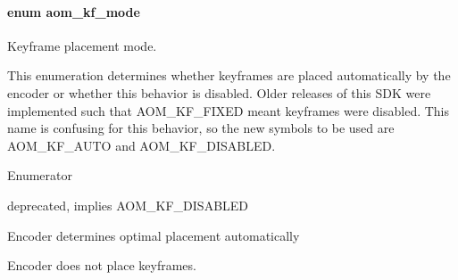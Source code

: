 \paragraph[{\texorpdfstring{aom\+\_\+kf\+\_\+mode}{aom_kf_mode}}]{\setlength{\rightskip}{0pt plus 5cm}enum {\bf aom\+\_\+kf\+\_\+mode}}\hypertarget{group__encoder_gac0498fc02cd368e6d9675cdb0bab5a84}{}\label{group__encoder_gac0498fc02cd368e6d9675cdb0bab5a84}


Keyframe placement mode. 

This enumeration determines whether keyframes are placed automatically by the encoder or whether this behavior is disabled. Older releases of this S\+DK were implemented such that A\+O\+M\+\_\+\+K\+F\+\_\+\+F\+I\+X\+ED meant keyframes were disabled. This name is confusing for this behavior, so the new symbols to be used are A\+O\+M\+\_\+\+K\+F\+\_\+\+A\+U\+TO and A\+O\+M\+\_\+\+K\+F\+\_\+\+D\+I\+S\+A\+B\+L\+ED. \begin{Desc}
\item[Enumerator]\par
\begin{description}
\item[{\em 
A\+O\+M\+\_\+\+K\+F\+\_\+\+F\+I\+X\+ED\hypertarget{group__encoder_ggac0498fc02cd368e6d9675cdb0bab5a84a8d6f57a670b8bd8f11dae3e89acedb1d}{}\label{group__encoder_ggac0498fc02cd368e6d9675cdb0bab5a84a8d6f57a670b8bd8f11dae3e89acedb1d}
}]deprecated, implies A\+O\+M\+\_\+\+K\+F\+\_\+\+D\+I\+S\+A\+B\+L\+ED \item[{\em 
A\+O\+M\+\_\+\+K\+F\+\_\+\+A\+U\+TO\hypertarget{group__encoder_ggac0498fc02cd368e6d9675cdb0bab5a84aea1965a235dea1b99d2b52145be35d4e}{}\label{group__encoder_ggac0498fc02cd368e6d9675cdb0bab5a84aea1965a235dea1b99d2b52145be35d4e}
}]Encoder determines optimal placement automatically \item[{\em 
A\+O\+M\+\_\+\+K\+F\+\_\+\+D\+I\+S\+A\+B\+L\+ED\hypertarget{group__encoder_ggac0498fc02cd368e6d9675cdb0bab5a84af81473ffe0169271763f9c9d05393405}{}\label{group__encoder_ggac0498fc02cd368e6d9675cdb0bab5a84af81473ffe0169271763f9c9d05393405}
}]Encoder does not place keyframes. \end{description}
\end{Desc}


